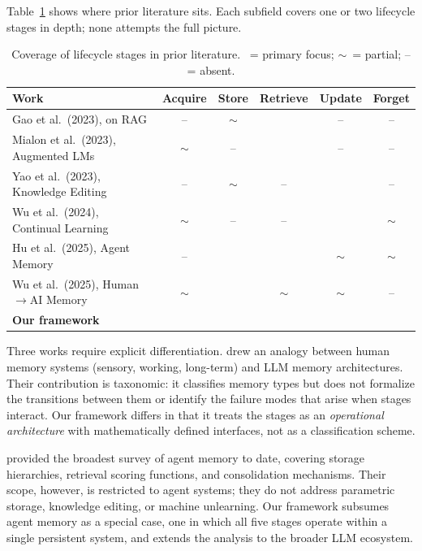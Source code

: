 \documentclass[manuscript, screen, review]{jair}
\newcommand{\fullmark}{\checkmark}
\newcommand{\halfmark}{$\sim$}
\begin{document}
Table~\ref{tab:survey_comparison} shows where prior literature sits. Each subfield covers one or two lifecycle stages in depth; none attempts the full picture.

\begin{table}[t]
\centering
\caption{Coverage of lifecycle stages in prior literature. \fullmark\ = primary focus; \halfmark\ = partial; -- = absent.}
\label{tab:survey_comparison}
\small
\begin{tabular}{@{}lccccc@{}}
\toprule
\textbf{Work} & \textbf{Acquire} & \textbf{Store} & \textbf{Retrieve} & \textbf{Update} & \textbf{Forget} \\
\midrule
Gao et al.\ (2023), on RAG & -- & \halfmark & \fullmark & -- & -- \\
Mialon et al.\ (2023), Augmented LMs & \halfmark & -- & \fullmark & -- & -- \\
Yao et al.\ (2023), Knowledge Editing & -- & \halfmark & -- & \fullmark & -- \\
Wu et al.\ (2024), Continual Learning & \halfmark & -- & -- & \fullmark & \halfmark \\
Hu et al.\ (2025), Agent Memory & -- & \fullmark & \fullmark & \halfmark & \halfmark \\
Wu et al.\ (2025), Human$\to$AI Memory & \halfmark & \fullmark & \halfmark & \halfmark & -- \\
\midrule
\textbf{Our framework} & \fullmark & \fullmark & \fullmark & \fullmark & \fullmark \\
\bottomrule
\end{tabular}
\vspace{-1em}
\end{table}

Three works require explicit differentiation. \citet{wu2025humanmemory} drew an analogy between human memory systems (sensory, working, long-term) and LLM memory architectures. Their contribution is taxonomic: it classifies memory types but does not formalize the transitions between them or identify the failure modes that arise when stages interact. Our framework differs in that it treats the stages as an \textit{operational architecture} with mathematically defined interfaces, not as a classification scheme.

\citet{hu2025agentmemory} provided the broadest survey of agent memory to date, covering storage hierarchies, retrieval scoring functions, and consolidation mechanisms. Their scope, however, is restricted to agent systems; they do not address parametric storage, knowledge editing, or machine unlearning. Our framework subsumes agent memory as a special case, one in which all five stages operate within a single persistent system, and extends the analysis to the broader LLM ecosystem.
\end{document}
